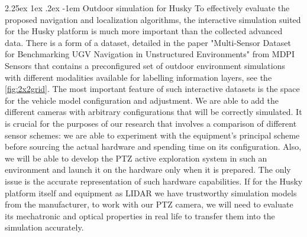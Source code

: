 \documentclass[runningheads]{llncs}
\makeatletter
\renewcommand\paragraph{\@startsection{paragraph}{4}{\z@}%
                                    {2.25ex \@plus1ex \@minus.2ex}%
                                    {-1em}%
                                    {\normalfont\normalsize\bfseries}}
\makeatother
\begin{document}
\paragraph{Outdoor simulation for Husky}
To effectively evaluate the proposed navigation and localization algorithms, the interactive simulation suited for the Husky platform is much more important than the collected advanced data. There is a form of a dataset, detailed in the paper "Multi-Sensor Dataset for Benchmarking UGV Navigation in Unstructured Environments" from MDPI Sensors \cite{AutomaticallyAnnotatedOutdoorsGazebo} that contains a preconfigured set of outdoor environment simulations with different modalities available for labelling information layers, see the \ref{fig:2x2grid}.
 The most important feature of such interactive datasets is the space for the vehicle model configuration and adjustment. We are able to add the different cameras with arbitrary configurations that will be correctly simulated. It is crucial for the purposes of our research that involves a comparison of different sensor schemes: we are able to experiment with the equipment's principal scheme before sourcing the actual hardware and spending time on its configuration. Also, we will be able to develop the PTZ active exploration system in such an environment and launch it on the hardware only when it is prepared. The only issue is the accurate representation of such hardware capabilities. If for the Husky platform itself and equipment as LIDAR \cite{hokuyo_utm_30lx_ew} we have trustworthy simulation models from the manufacturer, to work with our PTZ camera, we will need to evaluate its mechatronic and optical properties in real life to transfer them into the simulation accurately.
\end{document}
